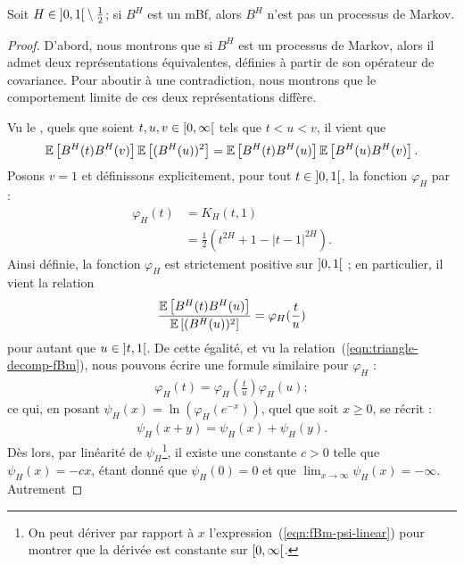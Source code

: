 \begin{theoreme}
  Soit $H\in\left]0,1\right[\setminus\frac{1}{2}$; si $B^H$ est un mBf,
  alors $B^H$ n'est pas un processus de Markov.
\end{theoreme}
\begin{proof}
  D'abord, nous montrons que si $B^H$ est un processus de Markov,
  alors il admet deux \og représentations \fg{} équivalentes, définies
  à partir de son opérateur de covariance. Pour aboutir à une
  contradiction, nous montrons que le comportement limite de ces deux
  \og représentations \fg{} diffère.
  
  Vu le , quels que soient
  $t,u,v\in\left[0,\infty\right[$ tels que $t<u<v$, il vient que
  \begin{align}
    \label{eqn:triangle-decomp-fBm}
    \mathbb{E}\left[B^H(t)B^H(v)\right]\mathbb{E}\left[(B^H(u))^2\right] = \mathbb{E}\left[B^H(t)B^H(u)\right]\mathbb{E}\left[B^H(u)B^H(v)\right].
  \end{align}
  Posons $v=1$ et définissons explicitement, pour tout
  $t\in\left]0,1\right[$, la fonction $\varphi_H$ par :
  \begin{align}
    \label{eqn:fBm-first-exp-varphi}
    \varphi_H(t) &= K_H(t,1) \\
                 &= \frac{1}{2}\left(t^{2H}+1-|t-1|^{2H}\right).
  \end{align}
  Ainsi définie, la fonction $\varphi_H$ est strictement positive sur
  $\left]0,1\right[$ ; en particulier, il vient la relation
  \begin{align*}
    \frac{\mathbb{E}\left[B^H(t)B^H(u)\right]}{\mathbb{E}\left[(B^H(u))^2\right]} = \varphi_H(\frac{t}{u})
  \end{align*}
  pour autant que $u\in\left]t,1\right[$. De cette égalité, et vu la
  relation~(\ref{eqn:triangle-decomp-fBm}), nous pouvons écrire une
  formule similaire pour $\varphi_H$ :
  \begin{align*}
    \varphi_H(t) = \varphi_H(\frac{t}{u})\varphi_H(u) ;
  \end{align*}
  ce qui, en posant $\psi_H(x) = \ln\left(\varphi_H(e^{-x})\right)$,
  quel que soit $x\geq 0$, se récrit :
  \begin{align}
    \label{eqn:fBm-psi-linear}
    \psi_H(x+y) = \psi_H(x)+\psi_H(y).
  \end{align}
  Dès lors, par linéarité de $\psi_H$\footnote{On peut dériver par
    rapport à $x$ l'expression~(\ref{eqn:fBm-psi-linear}) pour montrer
    que la dérivée est constante sur $\left[0,\infty\right[$.}, il existe
  une constante $c>0$ telle que $\psi_H(x)=-cx$, étant donné que
  $\psi_H(0)=0$ et que $\lim_{x\to\infty}\psi_H(x)=-\infty$. Autrement

\end{proof}

